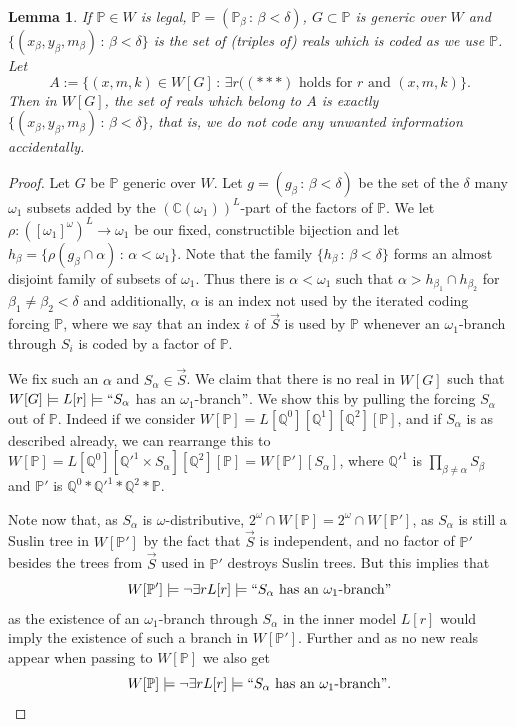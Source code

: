 \documentclass[a4paper,11pt]{article}
\newtheorem{lemma}[theorem]{Lemma}
\newcommand{\forceP}{\mathbb{P}}
\newcommand{\forceQ}{\mathbb{Q}}
\begin{document}
\begin{lemma}
If $\forceP \in W$ is legal, $\forceP=(\forceP_{\beta} \, : \, \beta < \delta)$, $G \subset \forceP$ is generic over $W$ and $\{ (x_{\beta},y_{\beta},m_{\beta} ) \, : \, \beta < \delta\}$ is the set of (triples of) reals which is coded as we use $\forceP$. Let 
\[A:= \{ (x,m,k) \in W[G] \, : \, \exists r ( ({\ast}{\ast}{\ast} )\text{ holds for $r$ and $(x,m,k)$} \}.  \] Then
in $W[G]$, the set of reals which belong to $A$ is exactly 
$\{ (x_{\beta},y_{\beta},m_{\beta} ) \, : \, \beta < \delta\}$, that is, we do not code any unwanted information accidentally.
\end{lemma}
\begin{proof}
Let $G$ be $\forceP$ generic over $W$. Let $g= (g_{\beta} \, : \, {\beta} < \delta)$ be the set of the $\delta$ many $\omega_1$ subsets added by the $(\mathbb{C} (\omega_1))^L$-part of the factors of $\forceP$. We let $\rho : ([\omega_1]^{\omega})^L \rightarrow \omega_1$ be our fixed, constructible bijection and let $h_{\beta}= \{ \rho (g_{\beta} \cap \alpha) \, : \, \alpha < \omega_1\}$. Note that the family $\{h_{\beta} \,: \, \beta < \delta \}$ forms an almost disjoint family of subsets of $\omega_1$. Thus there is $\alpha < \omega_1$ such that $\alpha> h_{\beta_1}\cap h_{\beta_2}$ for $\beta_1 \ne \beta_2 < \delta$ and additionally, $\alpha$ is an index not used by the iterated coding forcing $\forceP$, where we say that an index $i$ of $\vec{S}$ is used by $\forceP$ whenever an $\omega_1$-branch through $S_i$ is coded by a factor of $\forceP$.

We fix such an $\alpha$ and $S_{\alpha} \in \vec{S}$. We claim that there is no real in $W[G]$ such that $W[G] \models L[r] \models ``S_{\alpha}$ has an $\omega_1$-branch$"$.
We show this by pulling the forcing $S_{\alpha}$ out of $\forceP$. 
Indeed if we consider $W[\forceP]=L[\forceQ^0] [\forceQ^1][\forceQ^2][\forceP]$, and if $S_{\alpha}$ is as described already,
we can rearrange this to $W[\forceP]= L [\forceQ^0] [\forceQ'^1 \times S_{\alpha} ] [ \forceQ^2] [\forceP] = W[\forceP'] [S_{\alpha} ]$, where $\forceQ'^1$ is $\prod_{\beta \ne \alpha}  S_{\beta}$ and $\forceP'$ is $\forceQ^0 \ast \forceQ'^1 \ast \forceQ^2 \ast \forceP$.

Note now that, as $S_{\alpha}$ is $\omega$-distributive, $2^{\omega} \cap W[\forceP] = 2^{\omega} \cap W[\forceP']$, as $S_{\alpha}$ is still a Suslin tree in $W[\forceP']$ by the fact that $\vec{S}$ is independent, and no factor of $\forceP'$ besides the trees from $\vec{S}$ used in $\forceP'$ destroys Suslin trees. But this implies that 
\[W[\forceP'] \models \lnot \exists r L[r] \models `` S_{\alpha} \text{ has an $\omega_1$-branch}" \]
as the existence of an $\omega_1$-branch through $S_{\alpha}$ in the inner model $L[r]$ would imply the existence of such a branch in $W[\forceP']$. Further
and as no  new reals appear when passing to $W[\forceP]$ we also get 
\[W[\forceP] \models \lnot \exists r L[r] \models `` S_{\alpha} \text{ has an $\omega_1$-branch}". \]



\end{proof}
\end{document}

